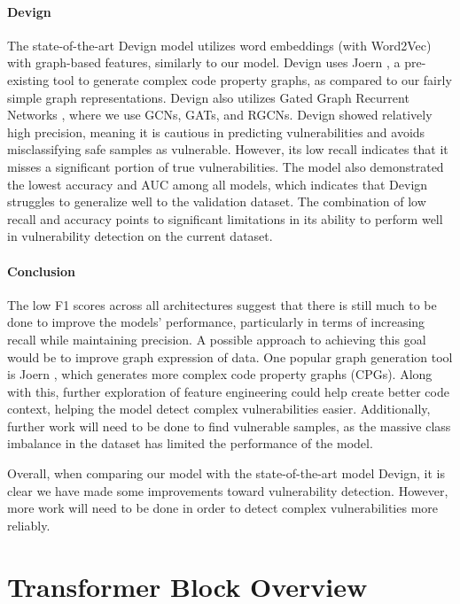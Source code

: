 \documentclass{article}
\begin{document}
\paragraph{Devign}
The state-of-the-art Devign model utilizes word embeddings (with Word2Vec) with graph-based features, similarly to our model. Devign uses Joern \cite{joern}, a pre-existing tool to generate complex code property graphs, as compared to our fairly simple graph representations. Devign also utilizes Gated Graph Recurrent Networks \cite{ggrn}, where we use GCNs, GATs, and RGCNs. Devign showed relatively high precision, meaning it is cautious in predicting vulnerabilities and avoids misclassifying safe samples as vulnerable. However, its low recall indicates that it misses a significant portion of true vulnerabilities. The model also demonstrated the lowest accuracy and AUC among all models, which indicates that Devign struggles to generalize well to the validation dataset. The combination of low recall and accuracy points to significant limitations in its ability to perform well in vulnerability detection on the current dataset.

\paragraph{Conclusion}
The low F1 scores across all architectures suggest that there is still much to be done to improve the models' performance, particularly in terms of increasing recall while maintaining precision. A possible approach to achieving this goal would be to improve graph expression of data. One popular graph generation tool is Joern \cite{joern}, which generates more complex code property graphs (CPGs). Along with this, further exploration of feature engineering could help create better code context, helping the model detect complex vulnerabilities easier. Additionally, further work will need to be done to find vulnerable samples, as the massive class imbalance in the dataset has limited the performance of the model.

Overall, when comparing our model with the state-of-the-art model Devign, it is clear we have made some improvements toward vulnerability detection. However, more work will need to be done in order to detect complex vulnerabilities more reliably.

\section{Transformer Block Overview}
\end{document}
